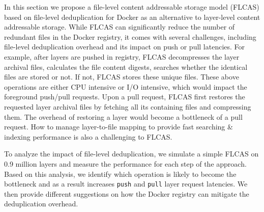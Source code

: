 %
In this section we propose a file-level content addressable storage model (FLCAS)
based on file-level deduplication
for Docker as an alternative to layer-level content addressable storage.
%
%
While FLCAS can significantly reduce the number of redundant files in the Docker
registry, it comes with several challenges, 
including file-level deduplication overhead and its impact on push or pull latencies.
For example, after layers are pushed in registry, FLCAS decompresses the layer archival files,
calculates the file content digests, searches whether the identical files are stored or not. 
If not, FLCAS stores these unique files.
%
These above operations are either CPU intensive or I/O intensive, which would impact 
the foreground push/pull requests.
%
Upon a pull request, FLCAS first restores the requested 
layer archival files by fetching all its containing files and compressing them.
%
The overhead of restoring a layer would become a bottleneck of a pull request.
%
How to manage layer-to-file mapping to provide fast searching \& indexing performance 
is also a challenging to FLCAS.
%
%

To analyze the impact of file-level deduplication, we simulate a simple FLCAS on
0.9 million layers and measure the performance for each step of the approach.
%
Based on this analysis, we identify which operation is likely to become the bottleneck
and as a result increases \texttt{push} and \texttt{pull} layer request latencies.
 
%
We then provide different suggestions on how the Docker registry can mitigate
the deduplication overhead.
%